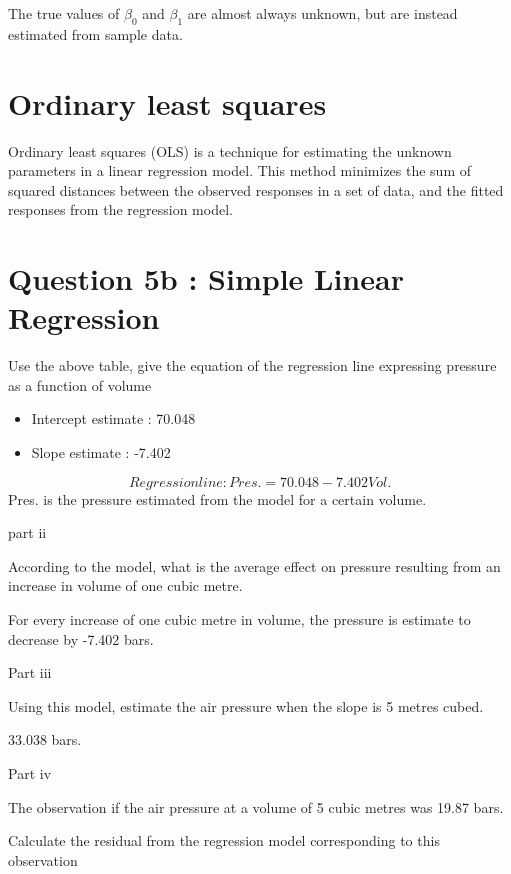 \documentclass[]{report}
\begin{document}
The true values of $\beta_0$ and  $\beta_1$ are almost always unknown, but are instead estimated from sample data.



	\section{Ordinary least squares}
	Ordinary least squares (OLS) is a technique for estimating the unknown parameters in a linear regression model. This method minimizes the sum of squared distances between the observed responses in a set of data, and the fitted responses from the regression model.
	


		
\section{Question 5b : Simple Linear Regression}

Use the above table, give the equation of the regression line expressing pressure as a function of volume

\begin{itemize}
	\item  Intercept estimate :	 70.048
	\item Slope estimate :         -7.402
\end{itemize}

\[
Regression line  : Pres.= 70.048 - 7.402Vol. 
\]
Pres.  is the pressure estimated from the model for a certain volume. 




part ii

According to the model, what is the average effect on pressure resulting from an increase in volume of one cubic metre.


For every increase of one cubic metre in volume, the pressure is estimate to decrease by -7.402  bars.


Part iii

Using this model, estimate the air pressure when the slope is 5 metres cubed.

33.038 bars.

Part iv

The observation if the air pressure at a volume of 5 cubic metres was 19.87 bars.

Calculate the residual from the regression model corresponding to this observation
\end{document}
